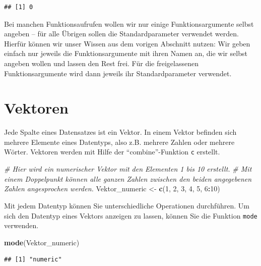 \documentclass[
  ngerman,
]{book}
\newenvironment{Shaded}{\begin{snugshade}}{\end{snugshade}}
\newcommand{\CommentTok}[1]{\textcolor[rgb]{0.56,0.35,0.01}{\textit{#1}}}
\newcommand{\DecValTok}[1]{\textcolor[rgb]{0.00,0.00,0.81}{#1}}
\newcommand{\FunctionTok}[1]{\textcolor[rgb]{0.13,0.29,0.53}{\textbf{#1}}}
\newcommand{\NormalTok}[1]{#1}
\newcommand{\OtherTok}[1]{\textcolor[rgb]{0.56,0.35,0.01}{#1}}
\newcommand{\SpecialCharTok}[1]{\textcolor[rgb]{0.81,0.36,0.00}{\textbf{#1}}}
\begin{document}
\begin{verbatim}
## [1] 0
\end{verbatim}

Bei manchen Funktionsaufrufen wollen wir nur einige Funktionsargumente selbst angeben -- für alle Übrigen sollen die Standardparameter verwendet werden. Hierfür können wir unser Wissen aus dem vorigen Abschnitt nutzen: Wir geben einfach nur jeweils die Funktionsargumente mit ihren Namen an, die wir selbst angeben wollen und lassen den Rest frei. Für die freigelassenen Funktionsargumente wird dann jeweils ihr Standardparameter verwendet.

\section{Vektoren}\label{vektoren}

Jede Spalte eines Datensatzes ist ein Vektor. In einem Vektor befinden sich mehrere Elemente eines Datentyps, also z.B. mehrere Zahlen oder mehrere Wörter. Vektoren werden mit Hilfe der ``combine''-Funktion \texttt{c} erstellt.

\begin{Shaded}
\begin{Highlighting}[]
\CommentTok{\# Hier wird ein numerischer Vektor mit den Elementen 1 bis 10 erstellt. }
\CommentTok{\# Mit einem Doppelpunkt können alle ganzen Zahlen zwischen den beiden angegebenen Zahlen angesprochen werden.}
\NormalTok{Vektor\_numeric }\OtherTok{\textless{}{-}} \FunctionTok{c}\NormalTok{(}\DecValTok{1}\NormalTok{, }\DecValTok{2}\NormalTok{, }\DecValTok{3}\NormalTok{, }\DecValTok{4}\NormalTok{, }\DecValTok{5}\NormalTok{, }\DecValTok{6}\SpecialCharTok{:}\DecValTok{10}\NormalTok{)}
\end{Highlighting}
\end{Shaded}

Mit jedem Datentyp können Sie unterschiedliche Operationen durchführen. Um sich den Datentyp eines Vektors anzeigen zu lassen, können Sie die Funktion \texttt{mode} verwenden.

\begin{Shaded}
\begin{Highlighting}[]
\FunctionTok{mode}\NormalTok{(Vektor\_numeric)}
\end{Highlighting}
\end{Shaded}

\begin{verbatim}
## [1] "numeric"
\end{verbatim}
\end{document}
